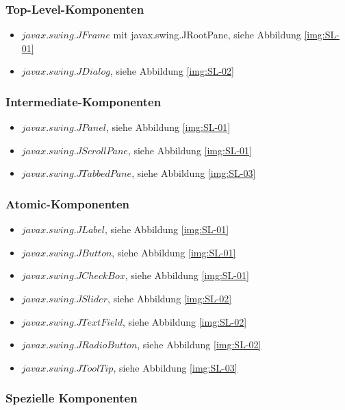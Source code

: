   \subsubsection{Top-Level-Komponenten}
  
  \begin{itemize}
    \item \(javax.swing.JFrame\) mit javax.swing.JRootPane, siehe Abbildung
    \ref{img:SL-01}
    \item \(javax.swing.JDialog\), siehe Abbildung \ref{img:SL-02}
  \end{itemize}
  
  \subsubsection{Intermediate-Komponenten}
  
  \begin{itemize}
    \item \(javax.swing.JPanel\), siehe Abbildung \ref{img:SL-01}
    \item \(javax.swing.JScrollPane\), siehe Abbildung \ref{img:SL-01}
    \item \(javax.swing.JTabbedPane\), siehe Abbildung \ref{img:SL-03}
  \end{itemize}
  
  \subsubsection{Atomic-Komponenten}
  
  \begin{itemize}
    \item \(javax.swing.JLabel\), siehe Abbildung \ref{img:SL-01}
    \item \(javax.swing.JButton\), siehe Abbildung \ref{img:SL-01}
    \item \(javax.swing.JCheckBox\), siehe Abbildung \ref{img:SL-01}
    \item \(javax.swing.JSlider\), siehe Abbildung \ref{img:SL-02}
    \item \(javax.swing.JTextField\), siehe Abbildung \ref{img:SL-02}
    \item \(javax.swing.JRadioButton\), siehe Abbildung \ref{img:SL-02}
    \item \(javax.swing.JToolTip\), siehe Abbildung \ref{img:SL-03}
  \end{itemize}
  
  \subsubsection{Spezielle Komponenten}
  
